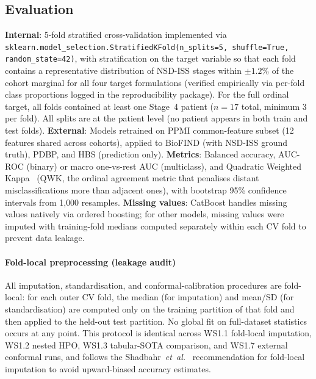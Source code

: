 \documentclass[10pt,letterpaper]{article}
\begin{document}
\subsection*{Evaluation}
\label{p1:sec:methods:evaluation}
\textbf{Internal}: 5-fold stratified cross-validation implemented via \texttt{sklearn.model\_selection.StratifiedKFold(n\_splits=5, shuffle=True, random\_state=42)}, with stratification on the target variable so that each fold contains a representative distribution of NSD-ISS stages within $\pm 1.2\%$ of the cohort marginal for all four target formulations (verified empirically via per-fold class proportions logged in the reproducibility package). For the full ordinal target, all folds contained at least one Stage~4 patient ($n{=}17$ total, minimum 3 per fold). All splits are at the patient level (no patient appears in both train and test folds).
\textbf{External}: Models retrained on PPMI common-feature subset (12 features shared across cohorts), applied to BioFIND (with NSD-ISS ground truth), PDBP, and HBS (prediction only).
\textbf{Metrics}: Balanced accuracy, AUC-ROC (binary) or macro one-vs-rest AUC (multiclass), and Quadratic Weighted Kappa~\cite{cohen1968} (QWK, the ordinal agreement metric that penalises distant misclassifications more than adjacent ones), with bootstrap 95\% confidence intervals from 1{,}000 resamples.
\textbf{Missing values}: CatBoost handles missing values natively via ordered boosting; for other models, missing values were imputed with training-fold medians computed separately within each CV fold to prevent data leakage.

\paragraph*{Fold-local preprocessing (leakage audit)} All imputation, standardisation, and conformal-calibration procedures are fold-local: for each outer CV fold, the median (for imputation) and mean/SD (for standardisation) are computed only on the training partition of that fold and then applied to the held-out test partition. No global fit on full-dataset statistics occurs at any point. This protocol is identical across WS1.1 fold-local imputation, WS1.2 nested HPO, WS1.3 tabular-SOTA comparison, and WS1.7 external conformal runs, and follows the Shadbahr~\textit{et~al.}~\cite{shadbahr2023imputation} recommendation for fold-local imputation to avoid upward-biased accuracy estimates.
\end{document}
